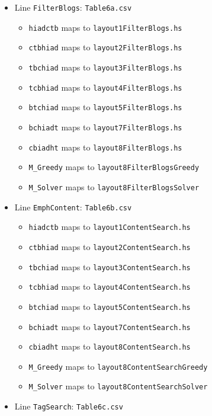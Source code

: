 \begin{itemize}
  \begin{itemize}
  \tightlist
  \item
    Line \texttt{FilterBlogs}: \texttt{Table6a.csv}

    \begin{itemize}
    \tightlist
    \item
      \texttt{hiadctb} maps to \texttt{layout1FilterBlogs.hs}
    \item
      \texttt{ctbhiad} maps to \texttt{layout2FilterBlogs.hs}
    \item
      \texttt{tbchiad} maps to \texttt{layout3FilterBlogs.hs}
    \item
      \texttt{tcbhiad} maps to \texttt{layout4FilterBlogs.hs}
    \item
      \texttt{btchiad} maps to \texttt{layout5FilterBlogs.hs}
    \item
      \texttt{bchiadt} maps to \texttt{layout7FilterBlogs.hs}
    \item
      \texttt{cbiadht} maps to \texttt{layout8FilterBlogs.hs}
    \item
      \texttt{M\_Greedy} maps to \texttt{layout8FilterBlogsGreedy}
    \item
      \texttt{M\_Solver} maps to \texttt{layout8FilterBlogsSolver}
    \end{itemize}
  \item
    Line \texttt{EmphContent}: \texttt{Table6b.csv}

    \begin{itemize}
    \tightlist
    \item
      \texttt{hiadctb} maps to \texttt{layout1ContentSearch.hs}
    \item
      \texttt{ctbhiad} maps to \texttt{layout2ContentSearch.hs}
    \item
      \texttt{tbchiad} maps to \texttt{layout3ContentSearch.hs}
    \item
      \texttt{tcbhiad} maps to \texttt{layout4ContentSearch.hs}
    \item
      \texttt{btchiad} maps to \texttt{layout5ContentSearch.hs}
    \item
      \texttt{bchiadt} maps to \texttt{layout7ContentSearch.hs}
    \item
      \texttt{cbiadht} maps to \texttt{layout8ContentSearch.hs}
    \item
      \texttt{M\_Greedy} maps to \texttt{layout8ContentSearchGreedy}
    \item
      \texttt{M\_Solver} maps to \texttt{layout8ContentSearchSolver}
    \end{itemize}
  \item
    Line \texttt{TagSearch}: \texttt{Table6c.csv}


\end{itemize}
\end{itemize}
